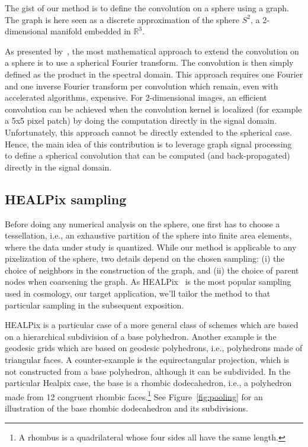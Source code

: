 \documentclass[final,twocolumn,3p,times,authoryear]{elsarticle}
\newcommand{\figref}[1]{Figure~\ref{fig:#1}}
\newcommand{\1}{\b{1}}              %
\newcommand{\0}{\b{0}}              %
\begin{document}
The gist of our method is to define the convolution on a sphere using a graph.
The graph is here seen as a discrete approximation of the sphere $S^2$, a
2-dimensional manifold embedded in $\mathbb{R}^3$.

As presented by~\cite{cohen2018spherical}, the most mathematical approach to
extend the convolution on a sphere is to use a spherical Fourier transform. The
convolution is then simply defined as the product in the spectral domain. This
approach requires one Fourier and one inverse Fourier transform per convolution
which remain, even with accelerated algorithms, expensive. For 2-dimensional
images, an efficient convolution can be achieved when the convolution kernel is
localized (for example a 5x5 pixel patch) by doing the computation directly in
the signal domain. Unfortunately, this approach cannot be directly extended to
the spherical case. Hence, the main idea of this contribution is to leverage
graph signal processing~\cite{shuman2013emerging} to define a spherical
convolution that can be computed (and back-propagated) directly in the signal domain.

\subsection{HEALPix sampling}
\label{sec:healpix}

Before doing any numerical analysis on the sphere, one first has to choose a tessellation, i.e., an exhaustive partition of the sphere into finite area elements, where the data under study is quantized.
While our method is applicable to any pixelization of the sphere, two details depend on the chosen sampling: (i) the choice of neighbors in the construction of the graph, and (ii) the choice of parent nodes when coarsening the graph.
As HEALPix~\citep{gorski2005healpix} is the most popular sampling used in cosmology, our target application, we'll tailor the method to that particular sampling in the subsequent exposition.

HEALPix is a particular case of a more general class of schemes which are based on a hierarchical subdivision of a base polyhedron.
Another example is the geodesic grids which are based on geodesic polyhedrons, i.e., polyhedrons made of triangular faces. A counter-example is the equirectangular projection, which is not constructed from a base polyhedron, although it can be subdivided.
In the particular Healpix case, the base is a rhombic dodecahedron, i.e., a polyhedron made from 12 congruent rhombic faces.\footnote{A rhombus is a quadrilateral whose four sides all have the same length.} See \figref{pooling} for an illustration of the base rhombic dodecahedron and its subdivisions.
\end{document}
